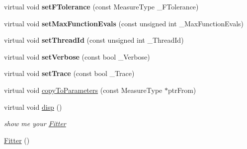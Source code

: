 \begin{DoxyCompactItemize}
\item 
virtual void {\bfseries set\+F\+Tolerance} (const Measure\+Type \+\_\+\+F\+Tolerance)\hypertarget{class_ox_1_1_fitter_aca7109a663e737c46cb29483c2276f4a}{}\label{class_ox_1_1_fitter_aca7109a663e737c46cb29483c2276f4a}

\item 
virtual void {\bfseries set\+Max\+Function\+Evals} (const unsigned int \+\_\+\+Max\+Function\+Evals)\hypertarget{class_ox_1_1_fitter_a293d2876b8b053bd637c35c3f6f3f68e}{}\label{class_ox_1_1_fitter_a293d2876b8b053bd637c35c3f6f3f68e}

\item 
virtual void {\bfseries set\+Thread\+Id} (const unsigned int \+\_\+\+Thread\+Id)\hypertarget{class_ox_1_1_fitter_aa1fc4674aa6a3e6c8567c86ec1fa90e0}{}\label{class_ox_1_1_fitter_aa1fc4674aa6a3e6c8567c86ec1fa90e0}

\item 
virtual void {\bfseries set\+Verbose} (const bool \+\_\+\+Verbose)\hypertarget{class_ox_1_1_fitter_a696da03b83fe3083f29ae4c0e2ecfc44}{}\label{class_ox_1_1_fitter_a696da03b83fe3083f29ae4c0e2ecfc44}

\item 
virtual void {\bfseries set\+Trace} (const bool \+\_\+\+Trace)\hypertarget{class_ox_1_1_fitter_a4ac0096f6bc6d733c542d28a839d32c9}{}\label{class_ox_1_1_fitter_a4ac0096f6bc6d733c542d28a839d32c9}

\item 
virtual void \hyperlink{class_ox_1_1_fitter_a783ba791c88d7208deb4004354b10022}{copy\+To\+Parameters} (const Measure\+Type $\ast$ptr\+From)
\item 
virtual void \hyperlink{class_ox_1_1_fitter_a0a9b45eb21ba174327f95a894e6331b6}{disp} ()\hypertarget{class_ox_1_1_fitter_a0a9b45eb21ba174327f95a894e6331b6}{}\label{class_ox_1_1_fitter_a0a9b45eb21ba174327f95a894e6331b6}

\begin{DoxyCompactList}\small\item\em show me your \hyperlink{class_ox_1_1_fitter}{Fitter} \end{DoxyCompactList}\item 
\hyperlink{class_ox_1_1_fitter_a7b42acb389394bc4c496990eea8b9ac9}{Fitter} ()\hypertarget{class_ox_1_1_fitter_a7b42acb389394bc4c496990eea8b9ac9}{}\label{class_ox_1_1_fitter_a7b42acb389394bc4c496990eea8b9ac9}


\end{DoxyCompactItemize}
